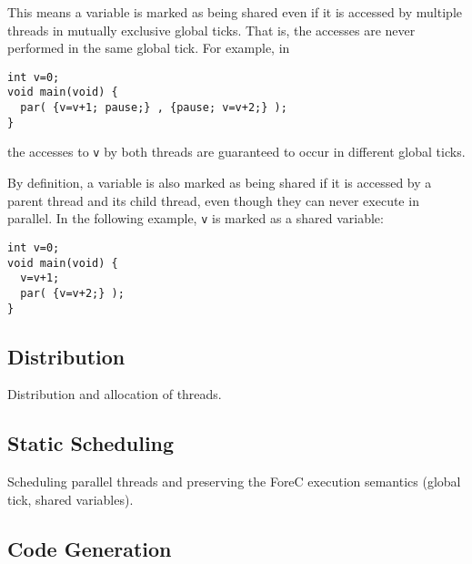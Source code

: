 
This means a variable is marked as being shared even if it is
accessed by multiple threads in mutually exclusive global ticks. 
That is, the accesses are never performed in the same global tick.
For example, in
\begin{lstlisting}[style=snippet]
int v=0;
void main(void) {
  par( {v=v+1; pause;} , {pause; v=v+2;} );
}
\end{lstlisting}
the accesses to \verb$v$ by both threads are guaranteed to occur in 
different global ticks.

By definition, a variable is also marked as being shared if it is 
accessed by a parent thread and its child thread, even though they
can never execute in parallel. In the following example, \verb$v$ 
is marked as a shared variable:
\begin{lstlisting}[style=snippet]
int v=0;
void main(void) {
  v=v+1;
  par( {v=v+2;} );
}
\end{lstlisting}

\subsection{Distribution}
Distribution and allocation of threads.

\subsection{Static Scheduling}
Scheduling parallel threads and preserving the ForeC execution semantics (global tick, shared variables).


\subsection{Code Generation}
